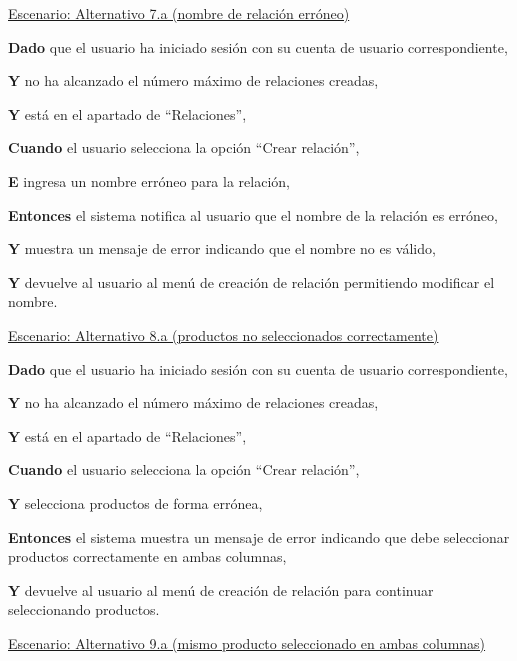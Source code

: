 \underline{Escenario: Alternativo 7.a (nombre de relación erróneo)}\par
\vspace{0.15cm}
\textbf{Dado} que el usuario ha iniciado sesión con su cuenta de usuario correspondiente,\par
\textbf{Y} no ha alcanzado el número máximo de relaciones creadas,\par
\textbf{Y} está en el apartado de \enquote{Relaciones},\par
\textbf{Cuando} el usuario selecciona la opción \enquote{Crear relación},\par
\textbf{E} ingresa un nombre erróneo para la relación,\par
\textbf{Entonces} el sistema notifica al usuario que el nombre de la relación es erróneo,\par
\textbf{Y} muestra un mensaje de error indicando que el nombre no es válido,\par
\textbf{Y} devuelve al usuario al menú de creación de relación permitiendo modificar el nombre.\par

\vspace{0.20cm}

\underline{Escenario: Alternativo 8.a (productos no seleccionados correctamente)}\par
\vspace{0.15cm}
\textbf{Dado} que el usuario ha iniciado sesión con su cuenta de usuario correspondiente,\par
\textbf{Y} no ha alcanzado el número máximo de relaciones creadas,\par
\textbf{Y} está en el apartado de \enquote{Relaciones},\par
\textbf{Cuando} el usuario selecciona la opción \enquote{Crear relación},\par
\textbf{Y} selecciona productos de forma errónea,\par
\textbf{Entonces} el sistema muestra un mensaje de error indicando que debe seleccionar productos correctamente en ambas columnas,\par
\textbf{Y} devuelve al usuario al menú de creación de relación para continuar seleccionando productos.\par

\vspace{0.20cm}

\underline{Escenario: Alternativo 9.a (mismo producto seleccionado en ambas columnas)}\par
\vspace{0.15cm}

